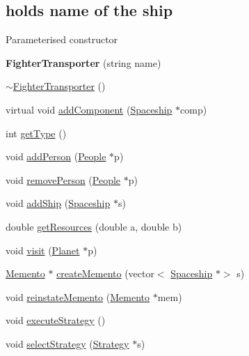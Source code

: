 \subsection*{holds name of the ship}
\label{_amgrpa1e51ca1f41febdb863218d3aed20946}%
 Parameterised constructor \begin{DoxyCompactItemize}
\item 
\mbox{\label{classFighterTransporter_a78524dc8ffee02d22f313c4e4186e252}} 
{\bfseries Fighter\+Transporter} (string name)
\item 
\hyperlink{classFighterTransporter_a65a48b07df846737c605337f69998eef}{$\sim$\+Fighter\+Transporter} ()
\item 
virtual void \hyperlink{classFighterTransporter_a962db4e241d764360407380ce1438788}{add\+Component} (\hyperlink{classSpaceship}{Spaceship} $\ast$comp)
\item 
int \hyperlink{classFighterTransporter_ad173e903951580bb222eb94896a15407}{get\+Type} ()
\item 
void \hyperlink{classFighterTransporter_a79b9099ea2cbdd17d1a0d6c8122e9bfa}{add\+Person} (\hyperlink{classPeople}{People} $\ast$p)
\item 
void \hyperlink{classFighterTransporter_a24a22da402edf3ad275ba52b7cbbf738}{remove\+Person} (\hyperlink{classPeople}{People} $\ast$p)
\item 
void \hyperlink{classFighterTransporter_ae4191358a54d0f30476beea30aa16317}{add\+Ship} (\hyperlink{classSpaceship}{Spaceship} $\ast$s)
\item 
double \hyperlink{classFighterTransporter_ab2b29c07f0e5fd4fa5e35a37abefb26d}{get\+Resources} (double a, double b)
\item 
void \hyperlink{classFighterTransporter_a9b7b1f27703841220d86ec142ceda43a}{visit} (\hyperlink{classPlanet}{Planet} $\ast$p)
\item 
\hyperlink{classMemento}{Memento} $\ast$ \hyperlink{classFighterTransporter_ac20f71500dbddc40b9c6fcfd0dfd3b46}{create\+Memento} (vector$<$ \hyperlink{classSpaceship}{Spaceship} $\ast$$>$ s)
\item 
void \hyperlink{classFighterTransporter_acad1a7b3d68741c58b632ff49b043414}{reinstate\+Memento} (\hyperlink{classMemento}{Memento} $\ast$mem)
\item 
void \hyperlink{classFighterTransporter_a0b0187f9eae58f2b24be8f7c9fc2a180}{execute\+Strategy} ()
\item 
void \hyperlink{classFighterTransporter_af7050ee155b38c4ae45d38d66bc5fc2f}{select\+Strategy} (\hyperlink{classStrategy}{Strategy} $\ast$s)
\end{DoxyCompactItemize}
